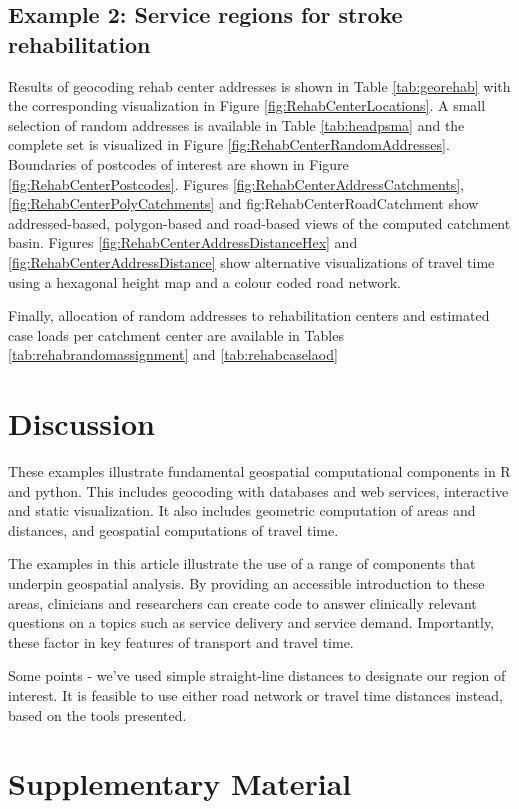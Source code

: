 \documentclass[utf8]{frontiersHLTH}
\begin{document}
\subsection{Example 2: Service regions for stroke rehabilitation}
Results of geocoding rehab center addresses is shown in Table
\ref{tab:georehab} with the corresponding visualization in Figure
\ref{fig:RehabCenterLocations}. A small selection of random addresses
is available in Table \ref{tab:headpsma} and the complete set is
visualized in Figure \ref{fig:RehabCenterRandomAddresses}. Boundaries
of postcodes of interest are shown in Figure
\ref{fig:RehabCenterPostcodes}. Figures
\ref{fig:RehabCenterAddressCatchments},
\ref{fig:RehabCenterPolyCatchments} and fig:RehabCenterRoadCatchment
show addressed-based, polygon-based and road-based views of the
computed catchment basin. Figures
\ref{fig:RehabCenterAddressDistanceHex} and
\ref{fig:RehabCenterAddressDistance} show alternative visualizations
of travel time using a hexagonal height map and a colour coded road
network.

Finally, allocation of random addresses to rehabilitation centers and
estimated case loads per catchment center are available in Tables
\ref{tab:rehabrandomassignment} and \ref{tab:rehabcaselaod}

\section{Discussion}\label{discussion}

These examples illustrate fundamental geospatial computational
components in R and python. This includes geocoding with databases and
web services, interactive and static visualization. It also includes
geometric computation of areas and distances, and geospatial
computations of travel time.

The examples in this article illustrate the use of a range of components
that underpin geospatial analysis. By providing an accessible
introduction to these areas, clinicians and researchers can create code
to answer clinically relevant questions on a topics such as service
delivery and service demand. Importantly, these factor in key features
of transport and travel time.

Some points - we've used simple straight-line distances to designate
our region of interest. It is feasible to use either road network or
travel time distances instead, based on the tools presented.

\section{Supplementary Material}\label{supplementary-material}
\end{document}
